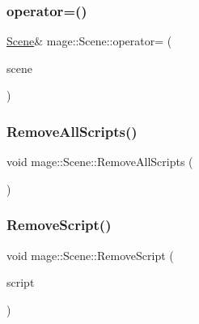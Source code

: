 \hypertarget{classmage_1_1_scene_a400926762670c9cd9b6d456291600f53}{}\label{classmage_1_1_scene_a400926762670c9cd9b6d456291600f53} 
\subsubsection{\texorpdfstring{operator=()}{operator=()}\hspace{0.1cm}{\footnotesize\ttfamily [2/2]}}
{\footnotesize\ttfamily \hyperlink{classmage_1_1_scene}{Scene}\& mage\+::\+Scene\+::operator= (\begin{DoxyParamCaption}\item[{\hyperlink{classmage_1_1_scene}{Scene} \&\&}]{scene }\end{DoxyParamCaption})\hspace{0.3cm}{\ttfamily [delete]}}

\hypertarget{classmage_1_1_scene_af610ef656fa46cb88638f1356ecee6a8}{}\label{classmage_1_1_scene_af610ef656fa46cb88638f1356ecee6a8} 
\subsubsection{\texorpdfstring{Remove\+All\+Scripts()}{RemoveAllScripts()}}
{\footnotesize\ttfamily void mage\+::\+Scene\+::\+Remove\+All\+Scripts (\begin{DoxyParamCaption}{ }\end{DoxyParamCaption})\hspace{0.3cm}{\ttfamily [noexcept]}}

\hypertarget{classmage_1_1_scene_a82705ba56543dea410439760b1667bc5}{}\label{classmage_1_1_scene_a82705ba56543dea410439760b1667bc5} 
\subsubsection{\texorpdfstring{Remove\+Script()}{RemoveScript()}}
{\footnotesize\ttfamily void mage\+::\+Scene\+::\+Remove\+Script (\begin{DoxyParamCaption}\item[{\hyperlink{namespacemage_a1e01ae66713838a7a67d30e44c67703e}{Shared\+Ptr}$<$ \hyperlink{classmage_1_1_behavior_script}{Behavior\+Script} $>$}]{script }\end{DoxyParamCaption})}

